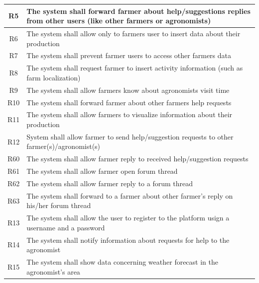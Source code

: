 \begin{center}
\begin{longtable}{|c|m{}|}
            \hline
            \textsc{R5}  &    The system shall forward farmer about help/suggestions replies from other users (like other farmers or agronomists)  \\
            \hline
            \textsc{R6}  &    The system shall allow only to farmers user to insert data about their production  \\
            \hline
            \textsc{R7}  &    The system shall prevent farmer users to access other farmers data  \\
            \hline
            \textsc{R8}  &    The system shall request farmer to insert activity information (such as farm localization)  \\
            \hline
            \textsc{R9}  &    The system shall allow farmers know about agronomists visit time  \\
            \hline
            \textsc{R10}  &    The system shall forward farmer about other farmers help requests  \\
            \hline
            \textsc{R11}  &    The system shall allow farmers to visualize information about their production  \\
            \hline
            \textsc{R12}  &    System shall allow farmer to send help/suggestion requests to other farmer(s)/agronomist(s)  \\
            \hline
            \textsc{R60}  &    The system shall allow farmer reply to received help/suggestion requests  \\
            \hline
            \textsc{R61}  &    The system shall allow farmer open forum thread  \\
            \hline
            \textsc{R62}  &    The system shall allow farmer reply to a forum thread  \\
            \hline
            \textsc{R63}  &    The system shall forward to a farmer about other farmer's reply on his/her forum thread  \\
            \hline
            \hline
            \hline
            \textsc{R13}  &    The system shall allow the user to register to the platform usign a username and a password  \\
            \hline
            \textsc{R14}  &    The system shall notify information about requests for help to the agronomist  \\
            \hline
            \textsc{R15}  &    The system shall show data concerning weather forecast in the agronomist's area  \\

\end{longtable}
\end{center}
